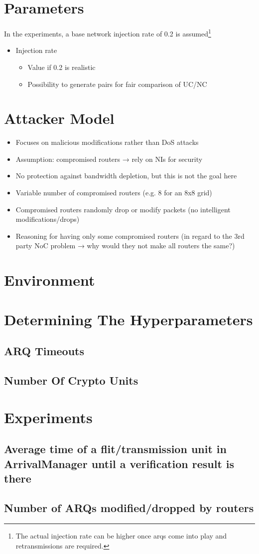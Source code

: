 \section{Parameters}
In the experiments, a base network injection rate of 0.2 is assumed\footnote{The actual injection rate can be higher once \glspl{arq} come into play
and retransmissions are required.}
\begin{itemize}
    \item Injection rate
        \begin{itemize}
            \item Value if 0.2 is realistic
            \item Possibility to generate pairs for fair comparison of UC/NC
        \end{itemize}
\end{itemize}

\section{Attacker Model}
\begin{itemize}
    \item Focuses on malicious modifications rather than DoS attacks
    \item Assumption: compromised routers → rely on NIs for security
    \item No protection against bandwidth depletion, but this is not the goal here
    \item Variable number of compromised routers (e.g. 8 for an 8x8 grid)
    \item Compromised routers randomly drop or modify packets (no intelligent modifications/drops)
    \item Reasoning for having only some compromised routers (in regard to the 3rd party NoC problem → why would they not make all routers the same?)
\end{itemize}

\section{Environment}

\section{Determining The Hyperparameters}
\subsection{ARQ Timeouts}
\subsection{Number Of Crypto Units}

\section{Experiments}
\subsection{Average time of a flit/transmission unit in ArrivalManager until a verification result is there}
\subsection{Number of ARQs modified/dropped by routers}
